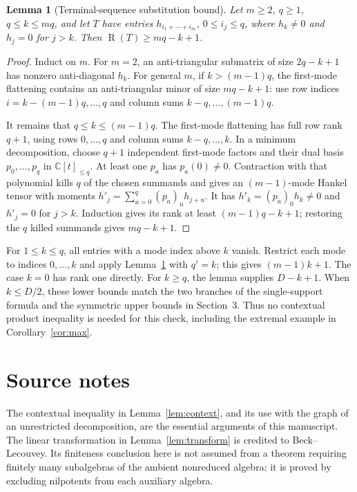 \documentclass[11pt]{article}
\newtheorem{lemma}[theorem]{Lemma}
\theoremstyle{definition}
\theoremstyle{remark}
\newcommand{\C}{\mathbb C}
\newcommand{\Rk}{\operatorname{R}}
\begin{document}
\begin{lemma}[Terminal-sequence substitution bound]\label{lem:terminal}
Let $m\ge2$, $q\ge1$, $q\le k\le mq$, and let $T$ have entries
$h_{i_1+\cdots+i_m}$, $0\le i_j\le q$, where $h_k\ne0$ and $h_j=0$ for $j>k$.
Then $\Rk(T)\ge mq-k+1$.
\end{lemma}
\begin{proof}
Induct on $m$. For $m=2$, an anti-triangular submatrix of size $2q-k+1$
has nonzero anti-diagonal $h_k$.
For general $m$, if $k>(m-1)q$, the first-mode flattening contains an
anti-triangular minor of size $mq-k+1$: use row indices
$i=k-(m-1)q,\ldots,q$ and column sums $k-q,\ldots,(m-1)q$.

It remains that $q\le k\le(m-1)q$. The first-mode flattening has full row
rank $q+1$, using rows $0,\ldots,q$ and column sums $k-q,\ldots,k$.
In a minimum decomposition, choose $q+1$ independent first-mode factors and
their dual basis $p_0,\ldots,p_q$ in $\C[t]_{\le q}$.
At least one $p_a$ has $p_a(0)\ne0$. Contraction with that polynomial kills
$q$ of the chosen summands and gives an $(m-1)$-mode Hankel tensor with moments
$h'_j=\sum_{u=0}^q(p_a)_u h_{j+u}$.
It has $h'_k=(p_a)_0h_k\ne0$ and $h'_j=0$ for $j>k$.
Induction gives its rank at least $(m-1)q-k+1$; restoring the $q$ killed
summands gives $mq-k+1$.
\end{proof}

For $1\le k\le q$, all entries with a mode index above $k$ vanish. Restrict
each mode to indices $0,\ldots,k$ and apply Lemma~\ref{lem:terminal} with
$q'=k$; this gives $(m-1)k+1$. The case $k=0$ has rank one directly.
For $k\ge q$, the lemma supplies $D-k+1$. When $k\le D/2$, these lower bounds
match the two branches of the single-support formula and the symmetric upper
bounds in Section~3. Thus no contextual product inequality is needed for this
check, including the extremal example in Corollary~\ref{cor:max}.

\section{Source notes}

The contextual inequality in Lemma~\ref{lem:context}, and its use with the graph
of an unrestricted decomposition, are the essential arguments of this
manuscript. The linear transformation in Lemma~\ref{lem:transform} is credited
to Beck--Lecouvey. Its finiteness conclusion here is not assumed from a theorem
requiring finitely many subalgebras of the ambient nonreduced algebra; it is
proved by excluding nilpotents from each auxiliary algebra.
\end{document}
